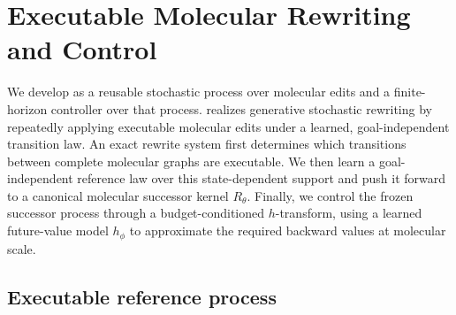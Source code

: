 %
%
\section{Executable Molecular Rewriting and Control}
\label{sec:method}

We develop \method{} as a reusable stochastic process over molecular edits and a finite-horizon controller over that process. \method{} realizes generative stochastic rewriting by repeatedly applying executable molecular edits under a learned, goal-independent transition law. An exact rewrite system first determines which transitions between complete molecular graphs are executable. We then learn a goal-independent reference law over this state-dependent support and push it forward to a canonical molecular successor kernel $R_\theta$. Finally, we control the frozen successor process through a budget-conditioned $h$-transform, using a learned future-value model $h_\phi$ to approximate the required backward values at molecular scale.

\subsection{Executable reference process}
\label{sec:gem-support}

